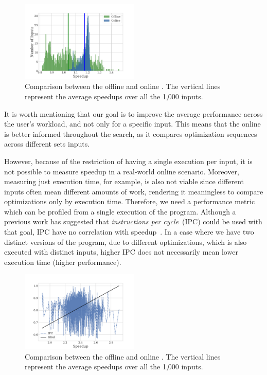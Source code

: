 \begin{figure}[ht]
    \centering
    \includegraphics[width=0.5\textwidth]{figs/motivation-online.pdf}
    \caption{Comparison between the offline and online {\itercomp}.
             The vertical lines represent the average speedups over
             all the 1,000 inputs.
             }
    \label{fig:motivation-online}
\end{figure}

It is worth mentioning that our goal is to improve the average performance
across the user's workload, and not only for a specific input.
This means that the online {\itercomp} is better informed throughout the search,
as it compares optimization sequences across different sets inputs.

However, because of the restriction of having a single execution per input,
it is not possible to measure speedup in a real-world online scenario.
Moreover, measuring just execution time, for example, is also not viable since
different inputs often mean different amounts of work,
rendering it meaningless to compare optimizations only by execution time.
Therefore, we need a performance metric which can be profiled from a single
execution of the program.
Although a previous work has suggested that \textit{instructions per cycle}~(IPC)
could be used with that goal, IPC have no correlation with speedup~\citep{fursin07}.
In a case where we have two distinct versions of the program, due to different
optimizations, which is also executed with distinct inputs, higher IPC does not
necessarily mean lower execution time (higher performance).

\begin{figure}[ht]
    \centering
    \includegraphics[width=0.5\textwidth]{figs/motivation-metric.pdf}
    \caption{Comparison between the offline and online {\itercomp}.
             The vertical lines represent the average speedups over
             all the 1,000 inputs.
             }
    \label{fig:motivation-metric}
\end{figure}

